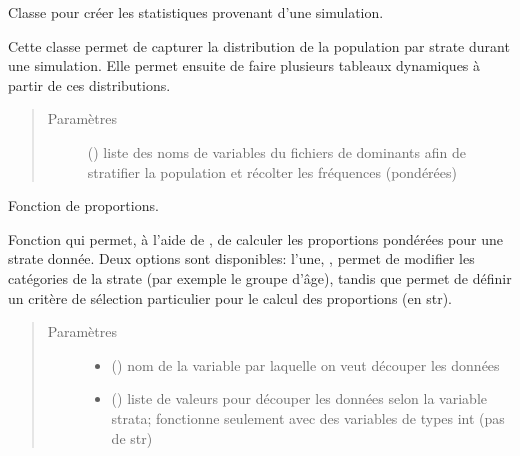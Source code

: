 \documentclass[letterpaper,10pt,french]{sphinxmanual}
\begin{document}
\begin{fulllineitems}
Classe pour créer les statistiques provenant d’une simulation.

Cette classe permet de capturer la distribution de la population par strate durant une simulation. Elle permet ensuite de faire plusieurs tableaux dynamiques à partir de ces distributions.
\begin{quote}\begin{description}
\item[{Paramètres}] \leavevmode
{} () \textendash{} liste des noms de variables du fichiers de dominants afin de stratifier la population et récolter les fréquences (pondérées)

\end{description}\end{quote}

\begin{fulllineitems}
\label{\detokenize{utilisation:simgen.statistics.prop}}
Fonction de proportions.

Fonction qui permet, à l’aide de , de calculer les proportions pondérées pour une strate donnée. Deux options sont disponibles: l’une, , permet de modifier les catégories de la strate (par exemple le groupe d’âge), tandis que  permet de définir un critère de sélection particulier pour le calcul des proportions (en str).
\begin{quote}\begin{description}
\item[{Paramètres}] \leavevmode\begin{itemize}
\item {} 
 () \textendash{} nom de la variable par laquelle on veut découper les données

\item {} 
 () \textendash{} liste de valeurs pour découper les données selon la variable strata; fonctionne seulement avec des variables de types int (pas de str)


\end{itemize}
\end{description}
\end{quote}
\end{fulllineitems}
\end{fulllineitems}
\end{document}
